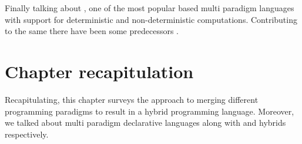 \documentclass[thesis-solanki.tex]{subfiles}
\begin{document}
Finally talking about , one of the most popular  based multi paradigm languages
with support for deterministic and non-deterministic computations. Contributing to the same there have been some
predecessors \cite{website:alf,website:toy}.        


\section{Chapter recapitulation}
Recapitulating, this chapter surveys the approach to merging different programming paradigms to result in a hybrid
programming language.
Moreover, we talked about multi paradigm declarative languages along with  and 
hybrids respectively.


\ifMain\ifDraft
\begin{scope}
  \nolinenumbers
  \enotesize
  \par
  \begin{singlespace}
  \setlength{\parskip}{12pt plus 2pt minus 1pt}
  \theendnotes
  \par
  \end{singlespace}
\end{scope}
\fi\fi
\end{document}
